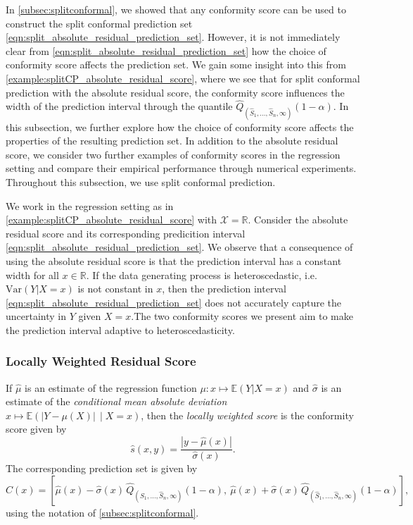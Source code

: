 \documentclass[11pt, titlepage]{article} %
\newcommand{\R}{\mathrm}
\newcommand{\Exp}[3]{\mathbb{E}\left#2 #1 \right#3}
\numberwithin{equation}{section}
\theoremstyle{definition}
\numberwithin{theorem}{section}
\numberwithin{lemma}{section}
\numberwithin{corollary}{section}
\numberwithin{proposition}{section}
\numberwithin{definition}{section}
\numberwithin{remark}{section}
\begin{document}
In \cref{subsec:splitconformal}, we showed that any conformity score can be used to construct the split conformal prediction set \eqref{eqn:split_absolute_residual_prediction_set}. However, it is not immediately clear from \eqref{eqn:split_absolute_residual_prediction_set} how the choice of conformity score affects the prediction set. We gain some insight into this from \cref{example:splitCP_absolute_residual_score}, where we see that for split conformal prediction with the absolute residual score, the conformity score influences the width of the prediction interval through the quantile \(\hat{Q}_{(\hat{S}_1, \ldots, \hat{S}_n, \infty)}(1-\alpha)\). In this subsection, we further explore how the choice of conformity score affects the properties of the resulting prediction set. In addition to the absolute residual score, we consider two further examples of conformity scores in the regression setting and compare their empirical performance through numerical experiments. Throughout this subsection, we use split conformal prediction. \vskip5pt

\noindent
We work in the regression setting as in \cref{example:splitCP_absolute_residual_score} with \(\mathcal{X} = \mathbb{R}\). Consider the absolute residual score and its corresponding predicition interval \eqref{eqn:split_absolute_residual_prediction_set}. We observe that a consequence of using the absolute residual score is that the prediction interval has a constant width for all \(x \in \mathbb{R}.\) If the data generating process is heteroscedastic, i.e. \(\R{Var}(Y | X = x)\) is not constant in \(x\), then the prediction interval \eqref{eqn:split_absolute_residual_prediction_set} does not accurately capture the uncertainty in \(Y\) given \(X = x\).The two conformity scores we present aim to make the prediction interval adaptive to heteroscedasticity. 

\subsubsection{Locally Weighted Residual Score}

If \(\hat{\mu}\) is an estimate of the regression function \(\mu:x \mapsto \Exp{Y | X = x}{(}{)}\) and \(\hat{\sigma}\) is an estimate of the \textit{conditional mean absolute deviation} \(x \mapsto \Exp{|Y-\mu(X)| \, \mid X = x}{(}{)}\), then the \textit{locally weighted score} is the conformity score given by \[
    \hat{s}(x,y) = \frac{| y - \hat{\mu}(x)|}{\hat{\sigma}(x)}.
\] The corresponding prediction set is given by \[
    C(x) = \left[ \hat{\mu}(x) - \hat{\sigma}(x) \, \hat{Q}_{(\hat{S}_1, \ldots, \hat{S}_n, \infty)}(1-\alpha), \ \hat{\mu}(x) + \hat{\sigma}(x) \, \hat{Q}_{(\hat{S}_1, \ldots, \hat{S}_n, \infty)}(1-\alpha) \right],
\] using the notation of \cref{subsec:splitconformal}. \vskip5pt
\end{document}
